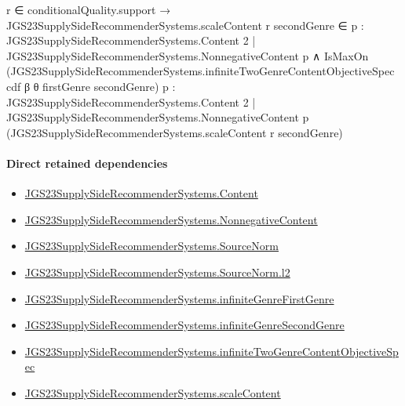 \documentclass[10pt]{article}
\begin{document}
\begin{ReviewVerbatim}
                                      r ∈ conditionalQuality.support →
                                        JGS23SupplySideRecommenderSystems.scaleContent r secondGenre ∈
                                            {p : JGS23SupplySideRecommenderSystems.Content 2 |
                                              JGS23SupplySideRecommenderSystems.NonnegativeContent p} ∧
                                          IsMaxOn
                                            (JGS23SupplySideRecommenderSystems.infiniteTwoGenreContentObjectiveSpec cdf
                                              β θ firstGenre secondGenre)
                                            {p : JGS23SupplySideRecommenderSystems.Content 2 |
                                              JGS23SupplySideRecommenderSystems.NonnegativeContent p}
                                            (JGS23SupplySideRecommenderSystems.scaleContent r secondGenre)
\end{ReviewVerbatim}

\paragraph{Direct retained dependencies}
\begin{itemize}\raggedright
\item \hyperlink{governing-declaration-367305fda50f0ada}{JGS23\allowbreak{}Supply\allowbreak{}Side\allowbreak{}Recommender\allowbreak{}Systems.\allowbreak{}Content}
\item \hyperlink{governing-declaration-d426babe40b9593c}{JGS23\allowbreak{}Supply\allowbreak{}Side\allowbreak{}Recommender\allowbreak{}Systems.\allowbreak{}Nonnegative\allowbreak{}Content}
\item \hyperlink{governing-declaration-6141339a5d3412d9}{JGS23\allowbreak{}Supply\allowbreak{}Side\allowbreak{}Recommender\allowbreak{}Systems.\allowbreak{}Source\allowbreak{}Norm}
\item \hyperlink{governing-declaration-9299663ffe3ecb38}{JGS23\allowbreak{}Supply\allowbreak{}Side\allowbreak{}Recommender\allowbreak{}Systems.\allowbreak{}Source\allowbreak{}Norm.\allowbreak{}l2}
\item \hyperlink{governing-declaration-c4e1c2ecd90525fd}{JGS23\allowbreak{}Supply\allowbreak{}Side\allowbreak{}Recommender\allowbreak{}Systems.\allowbreak{}infinite\allowbreak{}Genre\allowbreak{}First\allowbreak{}Genre}
\item \hyperlink{governing-declaration-4efa4a4608135f6d}{JGS23\allowbreak{}Supply\allowbreak{}Side\allowbreak{}Recommender\allowbreak{}Systems.\allowbreak{}infinite\allowbreak{}Genre\allowbreak{}Second\allowbreak{}Genre}
\item \hyperlink{governing-declaration-014c91b6cfe1e10b}{JGS23\allowbreak{}Supply\allowbreak{}Side\allowbreak{}Recommender\allowbreak{}Systems.\allowbreak{}infinite\allowbreak{}Two\allowbreak{}Genre\allowbreak{}Content\allowbreak{}Objective\allowbreak{}Spec}
\item \hyperlink{governing-declaration-c0824fcccb145634}{JGS23\allowbreak{}Supply\allowbreak{}Side\allowbreak{}Recommender\allowbreak{}Systems.\allowbreak{}scale\allowbreak{}Content}
\end{itemize}
\hypertarget{governing-declaration-c13a6748f5c431e4}{}
\end{document}
